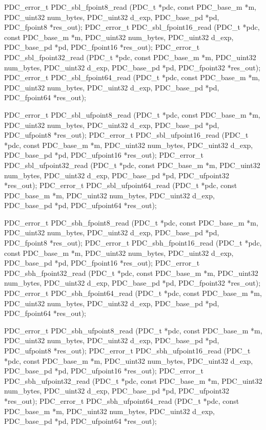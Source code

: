 \sbBegin{}
\bEnd{}

\begin{tinycodeaux}{\leftmargin=0in}
\codeallowbreaks
PDC_error_t PDC_sbl_fpoint8_read    (PDC_t *pdc, const PDC_base_m *m, PDC_uint32 num_bytes, PDC_uint32 d_exp,
				    PDC_base_pd *pd, PDC_fpoint8 *res_out);
PDC_error_t PDC_sbl_fpoint16_read   (PDC_t *pdc, const PDC_base_m *m, PDC_uint32 num_bytes, PDC_uint32 d_exp,
				    PDC_base_pd *pd, PDC_fpoint16 *res_out);
PDC_error_t PDC_sbl_fpoint32_read   (PDC_t *pdc, const PDC_base_m *m, PDC_uint32 num_bytes, PDC_uint32 d_exp,
				    PDC_base_pd *pd, PDC_fpoint32 *res_out);
PDC_error_t PDC_sbl_fpoint64_read   (PDC_t *pdc, const PDC_base_m *m, PDC_uint32 num_bytes, PDC_uint32 d_exp,
				    PDC_base_pd *pd, PDC_fpoint64 *res_out);

PDC_error_t PDC_sbl_ufpoint8_read   (PDC_t *pdc, const PDC_base_m *m, PDC_uint32 num_bytes, PDC_uint32 d_exp,
				    PDC_base_pd *pd, PDC_ufpoint8 *res_out);
PDC_error_t PDC_sbl_ufpoint16_read  (PDC_t *pdc, const PDC_base_m *m, PDC_uint32 num_bytes, PDC_uint32 d_exp,
				    PDC_base_pd *pd, PDC_ufpoint16 *res_out);
PDC_error_t PDC_sbl_ufpoint32_read  (PDC_t *pdc, const PDC_base_m *m, PDC_uint32 num_bytes, PDC_uint32 d_exp,
				    PDC_base_pd *pd, PDC_ufpoint32 *res_out);
PDC_error_t PDC_sbl_ufpoint64_read  (PDC_t *pdc, const PDC_base_m *m, PDC_uint32 num_bytes, PDC_uint32 d_exp,
				    PDC_base_pd *pd, PDC_ufpoint64 *res_out);

PDC_error_t PDC_sbh_fpoint8_read    (PDC_t *pdc, const PDC_base_m *m, PDC_uint32 num_bytes, PDC_uint32 d_exp,
				    PDC_base_pd *pd, PDC_fpoint8 *res_out);
PDC_error_t PDC_sbh_fpoint16_read   (PDC_t *pdc, const PDC_base_m *m, PDC_uint32 num_bytes, PDC_uint32 d_exp,
				    PDC_base_pd *pd, PDC_fpoint16 *res_out);
PDC_error_t PDC_sbh_fpoint32_read   (PDC_t *pdc, const PDC_base_m *m, PDC_uint32 num_bytes, PDC_uint32 d_exp,
				    PDC_base_pd *pd, PDC_fpoint32 *res_out);
PDC_error_t PDC_sbh_fpoint64_read   (PDC_t *pdc, const PDC_base_m *m, PDC_uint32 num_bytes, PDC_uint32 d_exp,
				    PDC_base_pd *pd, PDC_fpoint64 *res_out);

PDC_error_t PDC_sbh_ufpoint8_read   (PDC_t *pdc, const PDC_base_m *m, PDC_uint32 num_bytes, PDC_uint32 d_exp,
				    PDC_base_pd *pd, PDC_ufpoint8 *res_out);
PDC_error_t PDC_sbh_ufpoint16_read  (PDC_t *pdc, const PDC_base_m *m, PDC_uint32 num_bytes, PDC_uint32 d_exp,
				    PDC_base_pd *pd, PDC_ufpoint16 *res_out);
PDC_error_t PDC_sbh_ufpoint32_read  (PDC_t *pdc, const PDC_base_m *m, PDC_uint32 num_bytes, PDC_uint32 d_exp,
				    PDC_base_pd *pd, PDC_ufpoint32 *res_out);
PDC_error_t PDC_sbh_ufpoint64_read  (PDC_t *pdc, const PDC_base_m *m, PDC_uint32 num_bytes, PDC_uint32 d_exp,
				    PDC_base_pd *pd, PDC_ufpoint64 *res_out);
\end{tinycodeaux}

